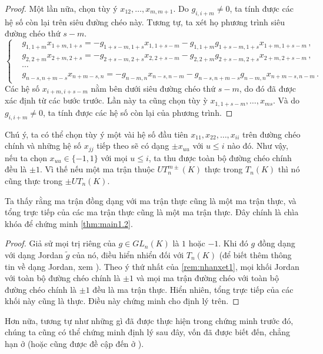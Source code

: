 \begin{proof}
Một lần nữa, chọn tùy ý $x_{12}, \dots, x_{m,m+1}$. Do $g_{i,i+m} \neq 0$, ta tính được các hệ số còn lại trên siêu đường chéo này.
Tương tự, ta xét họ phương trình siêu đường chéo thứ $s-m$.
\begin{equation*}
\left\{
\begin{aligned}
    &g_{1,1+m} x_{1+m,1+s} = - g_{1+s-m,1+s} x_{1,1+s-m} - g_{1,1+m} g_{1+s-m,1+s} x_{1+m,1+s-m}\,, \\
    &g_{2,2+m} x_{2+m,2+s} = - g_{2+s-m,2+s} x_{2,2+s-m} - g_{2,2+m} g_{2+s-m,2+s} x_{2+m,2+s-m}\,, \\
    &\cdots \\
    &g_{n-s,n+m-s} x_{n+m-s,n} = - g_{n-m,n} x_{n-s,n-m} - g_{n-s,n+m-s} g_{n-m,n} x_{n+m-s,n-m}\,.
\end{aligned}
\right.
\end{equation*}
Các hệ số $x_{i+m,i+s-m}$ nằm bên dưới siêu đường chéo thứ $s-m$, do đó đã được xác định từ các bước trước. Lần này ta cũng chọn tùy ỳ $x_{1,1+s-m},\dots,x_{ms}$. Và do $g_{i,i+m} \neq 0$, ta tính được các hệ số còn lại của phương trình. 
\end{proof}

Chú ý, ta có thể chọn tùy ý một vài hệ số đầu tiên $x_{11},x_{22},\dots,x_{ii}$ trên đường chéo chính và những hệ số $x_{jj}$ tiếp theo sẽ có dạng $\pm x_{uu}$ với $u\leq i$ nào đó. Như vậy, nếu ta chọn $x_{uu}\in\{-1,1\}$ với mọi $u\leq i$, ta thu được toàn bộ đường chéo chính đều là $\pm1$. Vì thế nếu một ma trận thuộc $UT_n^{m\pm}(K)$ thực trong $T_n(K)$ thì nó cũng thực trong $\pm UT_n(K)$.  

Ta thấy rằng ma trận đồng dạng với ma trận thực cũng là một ma trận thực, và tổng trực tiếp của các ma trận thực cũng là một ma trận thực. Đây chính là chìa khóa để chứng minh \cref{thm:main1.2}.

\begin{proof}
Giả sử mọi trị riêng của $g \in GL_n(K)$ là $1$ hoặc $-1$. Khi đó $g$ đồng dạng với dạng Jordan $\tilde{g}$ của nó, điều hiển nhiển đối với $T_n(K)$ (để biết thêm thông tin về dạng Jordan, xem \cite{Serre2002}). Theo ý thứ nhất của \cref{rem:nhanxet1}, mọi khối Jordan với toàn bộ đường chéo chính là $\pm1$ và mọi ma trận đường chéo với toàn bộ đường chéo chính là $\pm 1$ đều là ma trận thực. Hiển nhiên, tổng trực tiếp của các khối này cũng là thực. Điều này chứng minh cho định lý trên. 
\end{proof}

Hơn nữa, tương tự như những gì đã được thực hiện trong chứng minh trước đó, chúng ta cũng có thể chứng minh định lý sau đây, vốn đã được biết đến, chẳng hạn ở \cite{GillSingh2011a} (hoặc cũng được đề cập đến ở \cite{GillSingh2009,GillSingh2011b}).

